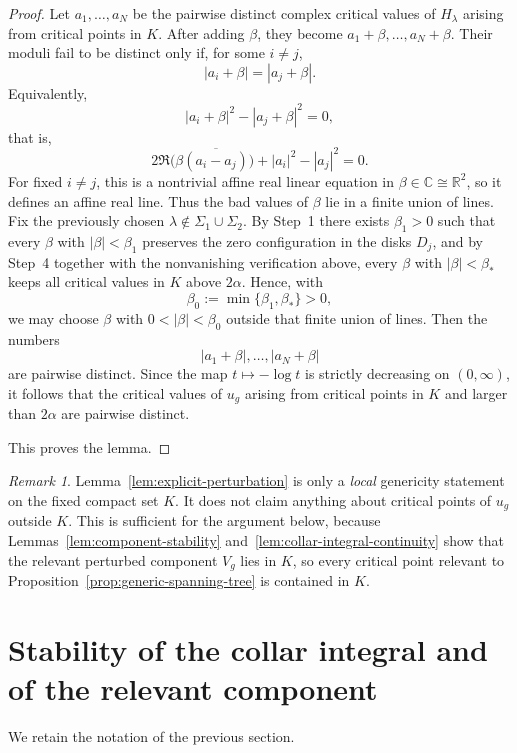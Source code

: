 \documentclass[12pt]{amsart}
\theoremstyle{definition}
\theoremstyle{remark}
\newtheorem*{remarkplain}{Remark}
\begin{document}
\begin{proof}
Let $a_1,\dots,a_N$ be the pairwise distinct complex critical
values of $H_\lambda$ arising from critical points in $K$. After adding $\beta$, they become $a_1+\beta,\dots,a_N+\beta$.
Their moduli fail to be distinct only if, for some $i\neq j$,
\[
 |a_i+\beta|=|a_j+\beta|.
\]
Equivalently,
\[
 |a_i+\beta|^2-|a_j+\beta|^2=0,
\]
that is,
\[
 2\Re\bigl(\beta \overline{(a_i-a_j)}\bigr)+|a_i|^2-|a_j|^2=0.
\]
For fixed $i\neq j$, this is a nontrivial affine real linear equation in $\beta\in\mathbb{C}\cong\mathbb{R}^2$, so it defines an affine
real line. Thus the bad values of $\beta$ lie in a finite union of lines. Fix the previously chosen $\lambda\notin \Sigma_1\cup\Sigma_2$.
By Step~1 there exists $\beta_1>0$ such that every $\beta$ with $|\beta|<\beta_1$ preserves the zero configuration in
the disks $D_j$, and by Step~4 together with the nonvanishing verification above,
every $\beta$ with $|\beta|<\beta_*$ keeps all critical values in $K$ above $2\alpha$. Hence,
with
\[
\beta_0:=\min\{\beta_1,\beta_*\}>0,
\]
we may choose $\beta$ with $0<|\beta|<\beta_0$ outside that finite union of lines. Then the numbers
\[
|a_1+\beta|,\dots,|a_N+\beta|
\]
are pairwise distinct. Since the map $t\mapsto -\log t$ is strictly decreasing on
$(0,\infty)$, it follows that the critical values of $u_g$ arising from critical points in
$K$ and larger than $2\alpha$ are pairwise distinct.

\indent This proves the lemma. \end{proof}

\begin{remarkplain}
Lemma~\ref{lem:explicit-perturbation} is only a \emph{local} genericity statement on the fixed compact set $K$. It does not claim anything about critical points of $u_g$ outside $K$. This is sufficient for the argument below, because Lemmas~\ref{lem:component-stability} and~\ref{lem:collar-integral-continuity} show that the relevant perturbed component $V_g$ lies in $K$, so every critical point relevant to Proposition~\ref{prop:generic-spanning-tree} is contained in $K$.
\end{remarkplain}



\section{Stability of the collar integral and of the relevant component}

We retain the notation of the previous section.
\end{document}
